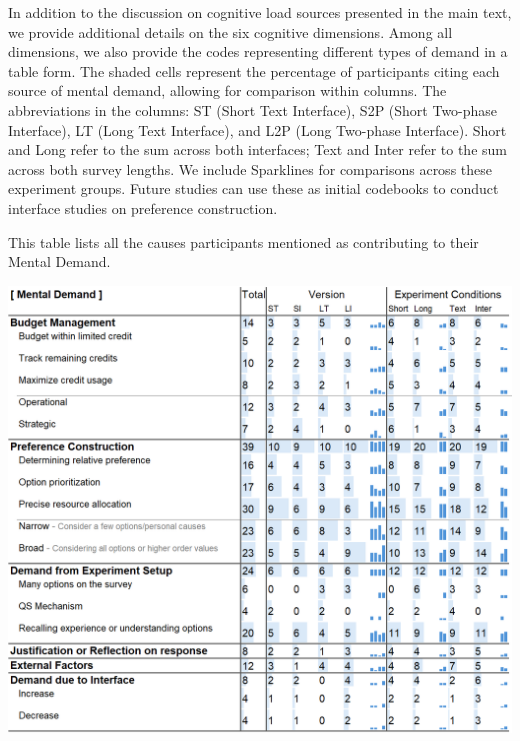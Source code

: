 In addition to the discussion on cognitive load sources presented in the main text, we provide additional details on the six cognitive dimensions. Among all dimensions, we also provide the codes representing different types of demand in a table form. The shaded cells represent the percentage of participants citing each source of mental demand, allowing for comparison within columns. The abbreviations in the columns: ST (Short Text Interface), S2P (Short Two-phase Interface), LT (Long Text Interface), and L2P (Long Two-phase Interface). Short and Long refer to the sum across both interfaces; Text and Inter refer to the sum across both survey lengths. We include Sparklines for comparisons across these experiment groups. Future studies can use these as initial codebooks to conduct interface studies on preference construction.

\begin{table}[p]
   \caption{This table lists all the causes participants mentioned as contributing to their Mental Demand.}
    \label{tbl:mental}
    \includegraphics[width=0.78\linewidth]{content/image/cog/mental_table.png}
\end{table}

